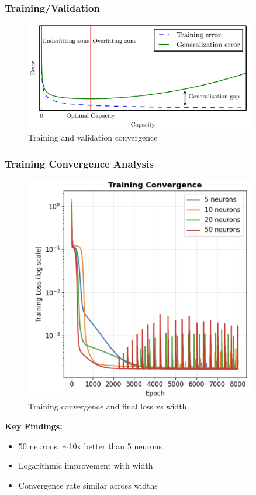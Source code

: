 \documentclass[notes]{beamer}
\begin{document}
\begin{frame}
\frametitle{Training/Validation}

\begin{figure}[ht]
	\centering
	\includegraphics[width=0.9\textwidth]{figs/training-validation-fit.png}
	\caption*{Training and validation convergence}
\end{figure}

\begin{frame}
\frametitle{Training Convergence Analysis}

\begin{figure}[ht]
	\centering
	\includegraphics[width=0.9\textwidth]{figs/training-convergence.png}
	\caption*{Training convergence and final loss vs width}
\end{figure}

\textbf{Key Findings:}
\begin{itemize}
\item 50 neurons: $\sim$10x better than 5 neurons
\item Logarithmic improvement with width
\item Convergence rate similar across widths
\end{itemize}


\end{frame}
\end{frame}
\end{document}
